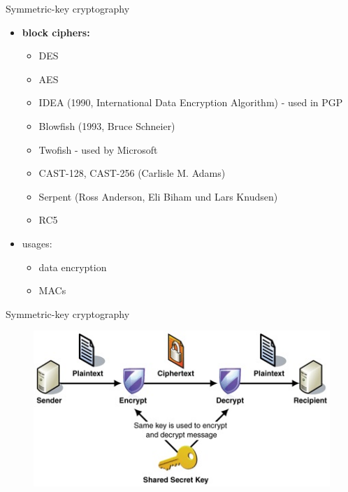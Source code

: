 \documentclass[pdf]{beamer}
\begin{document}
\begin{frame}{Symmetric-key cryptography}
\begin{itemize}
\item
\textbf{block ciphers:}
\begin{itemize}
\item
DES
\item
AES
\item
IDEA (1990, International Data Encryption Algorithm) - used in PGP
\item
Blowfish (1993, Bruce Schneier)
\item
Twofish - used by Microsoft
\item
CAST-128, CAST-256 (Carlisle M. Adams)
\item
Serpent (Ross Anderson, Eli Biham und Lars Knudsen)
\item
RC5
\end{itemize}

\item
usages:
\begin{itemize}
\item
data encryption
\item
MACs
\end{itemize}

\end{itemize}
\end{frame}



\begin{frame}{Symmetric-key cryptography}
\begin{figure}[t]
\centering
\includegraphics[scale=1]{Images/IC168364}
\end{figure}
\end{frame}
\end{document}
